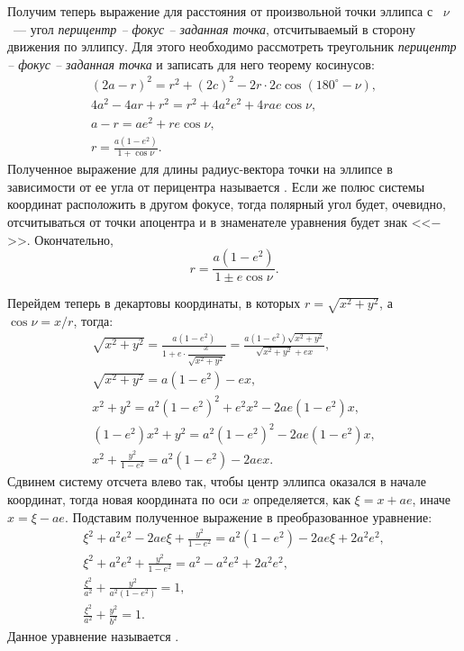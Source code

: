 Получим теперь выражение для расстояния от произвольной точки эллипса с ~$\nu$~--- угол
{\slshape перицентр -- фокус -- заданная точка},
отсчитываемый в сторону движения по эллипсу. Для этого необходимо рассмотреть треугольник {\slshape перицентр -- фокус -- заданная точка} и записать для него теорему косинусов:
\begin{gather*}
	(2a - r)^2 = r^2 + (2c)^2 - 2 r \cdot 2c \cos (180^\circ - \nu),\\
	4a^2 - 4ar + r^2 = r^2 + 4 a^2 e^2 + 4 r a e \cos \nu,\\
	a - r = ae^2 + re\cos \nu,\\
	r = \frac{a(1 - e^2)}{1 + \cos \nu}.
\end{gather*}
Полученное выражение для длины радиус-вектора точки на эллипсе в зависимости от ее угла от перицентра называется . Если же полюс системы координат расположить в другом фокусе, тогда полярный угол будет, очевидно, отсчитываться от точки апоцентра и в знаменателе уравнения будет знак <<$-$>>. Окончательно,
\begin{equation}
	r = \frac{a ( 1- e^2)}{1 \pm e \cos \nu}.
	\label{eq:ell-eq-pol}
\end{equation}

Перейдем теперь в декартовы координаты, в которых $r = \sqrt{x^2 + y^2}$, а $\cos \nu = x / r$, тогда:
\begin{gather*}
	\sqrt{x^2 + y^2} = \frac{a(1 - e^2)}{1 + e \cdot \dfrac{x}{\sqrt{x^2 + y^2}}} = \frac{a (1 - e^2) \sqrt{x^2 + y^2}}{\sqrt{x^2 + y^2} + e x},\\
	\sqrt{x^2 + y^2} = a(1 - e^2) - e x,\\
	x^2 + y^2 = a^2 (1 - e^2)^2 + e^2 x^2 - 2ae(1 - e^2) x,\\
	(1 - e^2) x^2 + y^2 = a^2 (1 - e^2)^2 - 2ae (1 - e^2) x,\\
	x^2 + \frac{y^2}{1 - e^2} = a^2 (1 - e^2) - 2aex.
\end{gather*}
Сдвинем систему отсчета влево так, чтобы центр эллипса оказался в начале координат, тогда новая координата по оси $x$ определяется, как $\xi = x + ae$, иначе $x = \xi - ae$. Подставим полученное выражение в преобразованное уравнение:
\begin{gather*}
	\xi^2 + a^2 e^2 - 2ae\xi + \frac{y^2}{1 - e^2} = a^2 (1 - e^2) - 2 ae\xi + 2 a^2 e^2,\\
	\xi^2 + a^2 e^2  + \frac{y^2}{1 - e^2} = a^2 - a^2 e^2 + 2 a^2 e^2,\\
	\frac{\xi^2}{a^2} + \frac{y^2}{a^2 (1 - e^2)} = 1,\\
	\frac{\xi^2}{a^2} + \frac{y^2}{b^2} = 1. \tag{\theequation} \label{eq:ell-eq-dec}
\end{gather*}
Данное уравнение называется .


